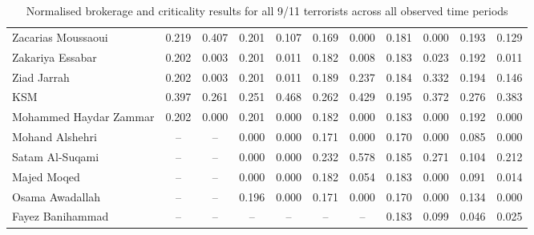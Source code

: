 \begin{subappendices}
\begin{table}
\begin{center}
\begin{tabular}{l cc cccccccc}
Zacarias Moussaoui     & 0.219     & 0.407       & 0.201     & 0.107       & 0.169     & 0.000        & 0.181     & 0.000       & 0.193            & 0.129             \\
Zakariya Essabar       & 0.202     & 0.003       & 0.201     & 0.011       & 0.182     & 0.008        & 0.183     & 0.023       & 0.192            & 0.011              \\
Ziad Jarrah            & 0.202     & 0.003       & 0.201     & 0.011       & 0.189     & 0.237        & 0.184     & 0.332       & 0.194            & 0.146              \\
KSM                    & 0.397     & 0.261       & 0.251     & 0.468       & 0.262     & 0.429        & 0.195     & 0.372       & 0.276            & 0.383             \\
Mohammed Haydar Zammar & 0.202     & 0.000       & 0.201     & 0.000       & 0.182     & 0.000        & 0.183     & 0.000       & 0.192            & 0.000               \\
Mohand Alshehri        & --        & --          & 0.000     & 0.000       & 0.171     & 0.000        & 0.170     & 0.000       & 0.085            & 0.000               \\
Satam Al-Suqami        & --        & --          & 0.000     & 0.000       & 0.232     & 0.578        & 0.185     & 0.271       & 0.104            & 0.212             \\
Majed Moqed            & --        & --          & 0.000     & 0.000       & 0.182     & 0.054        & 0.183     & 0.000       & 0.091            & 0.014               \\
Osama Awadallah        & --        & --          & 0.196     & 0.000       & 0.171     & 0.000        & 0.170     & 0.000       & 0.134            & 0.000               \\
Fayez Banihammad       & --        & --          & --        & --          & --        & --           & 0.183     & 0.099       & 0.046            & 0.025            \\
\bottomrule
\end{tabular}
\end{center}
\caption{Normalised brokerage and criticality results for all 9/11 terrorists across all observed time periods}
\label{allterrorists}
\end{table}

\end{subappendices}